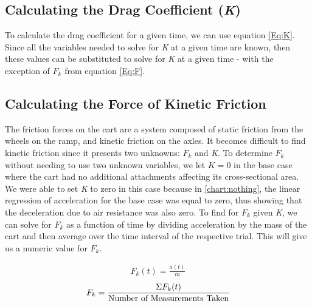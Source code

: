 \subsection{Calculating the Drag Coefficient (\textit{K})}
To calculate the drag coefficient for a given time, we can use equation \ref{Eq:K}.
Since all the variables needed to solve for \textit{K} at a given time are known, then 
these values can be substituted to solve for \textit{K} at a given time - with the exception of $F_{k}$ from
equation \ref{Eq:F}. 

\subsection{Calculating the Force of Kinetic Friction}
The friction forces on the cart are a system
composed of static friction from the wheels on the ramp, and kinetic friction on the axles. It
becomes difficult to find kinetic friction since it presents two unknowns: $F_{k}$ and \textit{K}.
To determine $F_{k}$ without needing to use two unknown variables, we let $K = 0$ in the base case
where the cart had no additional attachments affecting its cross-sectional area. We were able to set \textit{K}
to zero in this case because in \ref{chart:nothing}, the linear regression of acceleration for the base case was equal to zero, thus showing
that the deceleration due to air resistance was also zero. To find for $F_{k}$ given \textit{K}, we can solve
for $F_{k}$ as a function of time by dividing acceleration by the mass of the cart and then average over the time interval
of the respective trial. This will give us a numeric value for $F_{k}$.

\begin{gather*}
  F_{k}(t) = \frac{a(t)}{m}
\end{gather*}
\begin{equation}
  F_{k} = \frac{\Sigma F_{k}(t)}{\textup{Number of Measurements Taken}}
\end{equation}